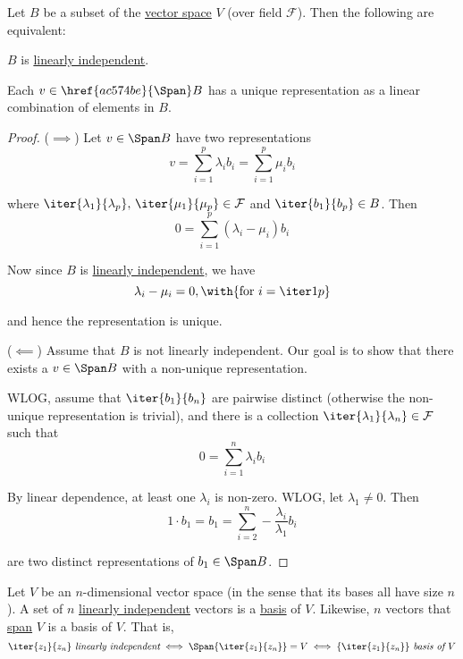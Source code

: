 \label{af98c68}

Let $B$ be a subset of the \href{fc83050}{vector space} $V$ (over field
$\mathcal F$). Then the following are equivalent:
\begin{enumerati}
  \item $B$ is \href{c133a44}{linearly independent}.
  \item Each $v\in\href{ac574be}{\Span}B$ has a unique representation as a
        linear combination of elements in $B$.
\end{enumerati}

\begin{proof}
  ($\implies$) Let $v\in\Span B$ have two representations
  $$
    v=\sum_{i=1}^p\lambda_ib_i=\sum_{i=1}^p\mu_ib_i
  $$

  where $\iter{\lambda_1}{\lambda_p},\,\iter{\mu_1}{\mu_p}\in\mathcal F$ and
  $\iter{b_1}{b_p}\in B$. Then
  $$
    0=\sum_{i=1}^p(\lambda_i-\mu_i)b_i
  $$

  Now since $B$ is \href{c133a44}{linearly independent}, we have
  $$
    \lambda_i-\mu_i=0,\with{\text{for }i=\iter1p}
  $$

  and hence the representation is unique.

  ($\impliedby$) Assume that $B$ is not linearly independent. Our goal is to
  show that there exists a $v\in\Span B$ with a non-unique representation.

  WLOG, assume that $\iter{b_1}{b_n}$ are pairwise distinct (otherwise the
  non-unique representation is trivial), and there is a collection
  $\iter{\lambda_1}{\lambda_n}\in\mathcal F$ such that
  $$
    0=\sum_{i=1}^n\lambda_ib_i
  $$

  By linear dependence, at least one $\lambda_i$ is non-zero. WLOG, let
  $\lambda_1\neq0$. Then
  $$
    1\cdot b_1=b_1=\sum_{i=2}^n-\frac{\lambda_i}{\lambda_1}b_i
  $$

  are two distinct representations of $b_1\in\Span B$.
\end{proof}

\label{c8f8fd3}

Let $V$ be an $n$-dimensional vector space (in the sense that its bases all
have size $n$). A set of $n$ \href{c133a44}{linearly independent} vectors is a
\href{db2477b}{basis} of $V$. Likewise, $n$ vectors that \href{ac574be}{span}
$V$ is a basis of $V$. That is,
$$
  \iter{z_1}{z_n}\textit{ linearly independent} \iff
  \Span\{\iter{z_1}{z_n}\}=V \iff
  \{\iter{z_1}{z_n}\}\textit{ basis of }V
$$


